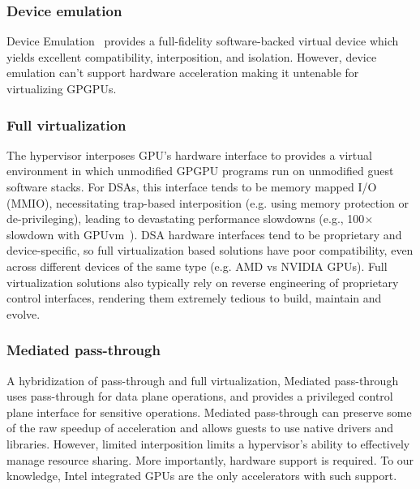 \subsubsection{Device emulation}
Device Emulation~\cite{bellard2005qemu} provides a full-fidelity
software-backed virtual device which yields excellent compatibility,
interposition, and isolation. However, device emulation can't support hardware
acceleration making it untenable for virtualizing GPGPUs.

\subsubsection{Full virtualization}
The hypervisor interposes GPU's hardware interface to provides a virtual
environment in which unmodified GPGPU programs run on unmodified guest
software stacks.
For DSAs, this interface tends to be memory mapped I/O (MMIO), necessitating
trap-based interposition (e.g. using memory protection or de-privileging),
leading to devastating performance slowdowns (e.g., 100$\times$ slowdown with
GPUvm~\cite{suzuki2014gpuvm,yu2017fullvirt}). DSA hardware interfaces tend to
be proprietary and device-specific, so full virtualization based solutions
have poor compatibility, even across different devices of the same type (e.g.
AMD vs NVIDIA GPUs). Full virtualization solutions also typically rely on
reverse engineering of proprietary control interfaces, rendering them
extremely tedious to build, maintain and evolve.

\subsubsection{Mediated pass-through}
A hybridization of pass-through and full virtualization, Mediated
pass-through~\cite{gVirt,mdev-mvme,vpio} uses pass-through for data plane
operations, and provides a privileged control plane interface for sensitive
operations. Mediated pass-through can preserve some of the raw speedup of
acceleration and allows guests to use native drivers and libraries.
However, limited interposition limits a hypervisor's ability to effectively
manage resource sharing. More importantly, hardware support is required. To
our knowledge, Intel integrated GPUs are the only accelerators with such
support.

